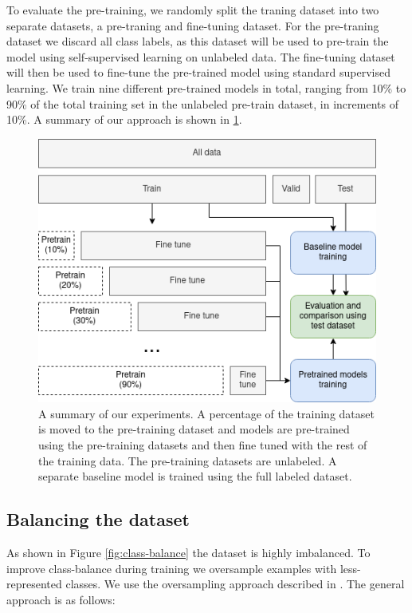 \documentclass[conference]{IEEEtran}
\begin{document}
To evaluate the pre-training, we randomly split the traning dataset into two separate datasets, a pre-traning and fine-tuning dataset. For the pre-traning dataset we discard all class labels, as this dataset will be used to pre-train the model using self-supervised learning on unlabeled data. The fine-tuning dataset will then be used to fine-tune the pre-trained model using standard supervised learning. We train nine different pre-trained models in total, ranging from 10\% to 90\% of the total training set in the unlabeled pre-train dataset, in increments of 10\%. A summary of our approach is shown in \ref{fig:dataset-split-summary}.

\begin{figure}[h]
\centering
\includegraphics[width=\columnwidth]{images/dataset-split-summary}
\caption{A summary of our experiments. A percentage of the training dataset is moved to the pre-training dataset and models are pre-trained using the pre-training datasets and then fine tuned with the rest of the training data. The pre-training datasets are unlabeled. A separate baseline model is trained using the full labeled dataset.}
\label{fig:dataset-split-summary}
\end{figure}

\subsection{Balancing the dataset}

As shown in Figure \ref{fig:class-balance} the dataset is highly imbalanced. To improve class-balance during training we oversample examples with less-represented classes. We use the oversampling approach described in \cite{gupta2019lvis}. The general approach is as follows:
\end{document}
